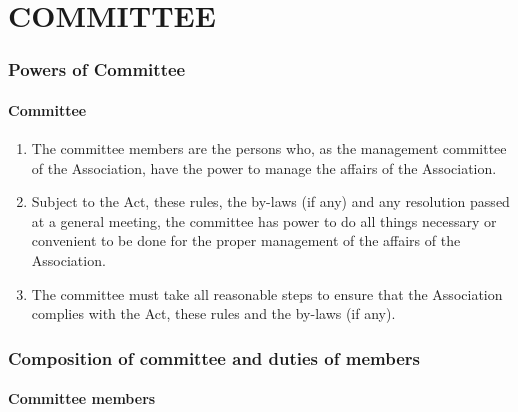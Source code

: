 \documentclass[../constitution.tex]{subfiles}
\begin{document}
\hypertarget{part-5-committee}{%
\part{COMMITTEE}\label{part-5-committee}}

\hypertarget{division-1-powers-of-committee}{%
\section{Powers of Committee}\label{division-1-powers-of-committee}}

\hypertarget{committee}{%
\subsection{Committee}\label{committee}}

\begin{enumerate}

\item The committee members are the persons who, as the management committee of the Association, have the power to manage the affairs of the Association.
\item Subject to the Act, these rules, the by-laws (if any) and any resolution passed at a general meeting, the committee has power to do all things necessary or convenient to be done for the proper management of the affairs of the Association.
\item The committee must take all reasonable steps to ensure that the Association complies with the Act, these rules and the by-laws (if any).
\end{enumerate}

\hypertarget{division-2-composition-of-committee-and-duties-of-members}{%
\section{Composition of committee and duties of members}\label{division-2-composition-of-committee-and-duties-of-members}}

\hypertarget{committee-members}{%
\subsection{Committee members}\label{committee-members}}
\end{document}
